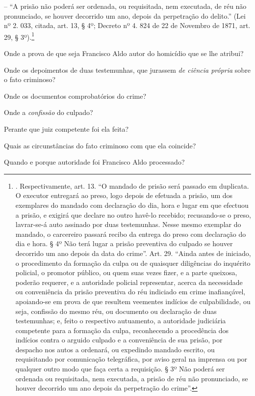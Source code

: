 -- ``A prisão não poderá ser ordenada, ou requisitada, nem executada, de
réu não pronunciado, se houver decorrido um ano, depois da perpetração
do delito.'' (Lei nº 2. 033, citada, art. 13, § 4º; Decreto nº 4. 824 de
22 de Novembro de 1871, art. 29, § 3º).\footnote{. Respectivamente, art.
  13. ``O mandado de prisão será passado em duplicata. O executor
  entregará ao preso, logo depois de efetuada a prisão, um dos
  exemplares do mandado com declaração do dia, hora e lugar em que
  efectuou a prisão, e exigirá que declare no outro havê-lo recebido;
  recusando-se o preso, lavrar-se-á auto assinado por duas testemunhas.
  Nesse mesmo exemplar do mandado, o carcereiro passará recibo da
  entrega do preso com declaração do dia e hora. § 4º Não terá lugar a
  prisão preventiva do culpado se houver decorrido um ano depois da data
  do crime''. Art. 29. ``Ainda antes de iniciado, o procedimento da
  formação da culpa ou de quaisquer diligências do inquérito policial, o
  promotor público, ou quem suas vezes fizer, e a parte queixosa,
  poderão requerer, e a autoridade policial representar, acerca da
  necessidade ou conveniência da prisão preventiva do réu indiciado em
  crime inafiançável, apoiando-se em prova de que resultem veementes
  indícios de culpabilidade, ou seja, confissão do mesmo réu, ou
  documento ou declaração de duas testemunhas; e, feito o respectivo
  autuamento, a autoridade judiciária competente para a formação da
  culpa, reconhecendo a procedência dos indícios contra o arguido
  culpado e a conveniência de sua prisão, por despacho nos autos a
  ordenará, ou expedindo mandado escrito, ou requisitando por
  comunicação telegráfica, por aviso geral na imprensa ou por qualquer
  outro modo que faça certa a requisição. § 3º Não poderá ser ordenada
  ou requisitada, nem executada, a prisão de réu não pronunciado, se
  houver decorrido um ano depois da perpetração do crime''.}

Onde a prova de que seja Francisco Aldo autor do homicídio que se lhe
atribui?

Onde os depoimentos de duas testemunhas, que jurassem \emph{de ciência
própria} sobre o fato criminoso?

Onde os documentos comprobatórios do crime?

Onde a \emph{confissão} do culpado?

Perante que juiz competente foi ela feita?

Quais as circunstâncias do fato criminoso com que ela coincide?

Quando e porque autoridade foi Francisco Aldo processado?

